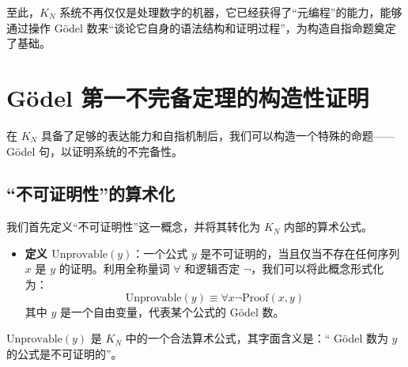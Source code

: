 \documentclass[a4paper,12pt]{ctexart}
\begin{document}
至此，$K_N$ 系统不再仅仅是处理数字的机器，它已经获得了“元编程”的能力，能够通过操作 Gödel 数来“谈论它自身的语法结构和证明过程”，为构造自指命题奠定了基础。

\section{Gödel 第一不完备定理的构造性证明}
在 $K_N$ 具备了足够的表达能力和自指机制后，我们可以构造一个特殊的命题——Gödel 句，以证明系统的不完备性。

\subsection{“不可证明性”的算术化}
我们首先定义“不可证明性”这一概念，并将其转化为 $K_N$ 内部的算术公式。
\begin{itemize}[leftmargin=*,noitemsep,topsep=0pt]
    \item \textbf{定义 $\text{Unprovable}(y)$}：一个公式 $y$ 是不可证明的，当且仅当不存在任何序列 $x$ 是 $y$ 的证明。利用全称量词 $\forall$ 和逻辑否定 $\neg$，我们可以将此概念形式化为：
    \begin{equation}
        \text{Unprovable}(y) \equiv \forall x \neg \text{Proof}(x, y) \label{eq:unprovable}
    \end{equation}
    其中 $y$ 是一个自由变量，代表某个公式的 Gödel 数。
\end{itemize}
$\text{Unprovable}(y)$ 是 $K_N$ 中的一个合法算术公式，其字面含义是：“ Gödel 数为 $y$ 的公式是不可证明的”。
\end{document}
